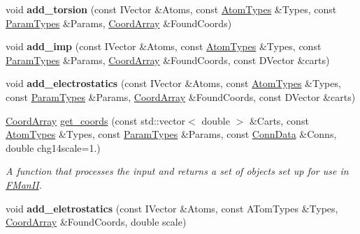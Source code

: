 \begin{DoxyCompactItemize}
\item 
void {\bfseries add\+\_\+torsion} (const I\+Vector \&Atoms, const \hyperlink{namespaceFManII_add1cccdf9425a71de6835b2631b84db8}{Atom\+Types} \&Types, const \hyperlink{namespaceFManII_a16edca665b5dfcdf9b3995844ad01bb5}{Param\+Types} \&Params, \hyperlink{namespaceFManII_a988516dba14437f483faf9f3c6d40c25}{Coord\+Array} \&Found\+Coords)\hypertarget{namespaceFManII_a881ebfcaac60e0da1409cc566861ab52}{}\label{namespaceFManII_a881ebfcaac60e0da1409cc566861ab52}

\item 
void {\bfseries add\+\_\+imp} (const I\+Vector \&Atoms, const \hyperlink{namespaceFManII_add1cccdf9425a71de6835b2631b84db8}{Atom\+Types} \&Types, const \hyperlink{namespaceFManII_a16edca665b5dfcdf9b3995844ad01bb5}{Param\+Types} \&Params, \hyperlink{namespaceFManII_a988516dba14437f483faf9f3c6d40c25}{Coord\+Array} \&Found\+Coords, const D\+Vector \&carts)\hypertarget{namespaceFManII_a3ebe80f5c7bbe67ecd94fd2512858045}{}\label{namespaceFManII_a3ebe80f5c7bbe67ecd94fd2512858045}

\item 
void {\bfseries add\+\_\+electrostatics} (const I\+Vector \&Atoms, const \hyperlink{namespaceFManII_add1cccdf9425a71de6835b2631b84db8}{Atom\+Types} \&Types, const \hyperlink{namespaceFManII_a16edca665b5dfcdf9b3995844ad01bb5}{Param\+Types} \&Params, \hyperlink{namespaceFManII_a988516dba14437f483faf9f3c6d40c25}{Coord\+Array} \&Found\+Coords, const D\+Vector \&carts)\hypertarget{namespaceFManII_a8e4be217fb18b91403f97d99b3b4c8ac}{}\label{namespaceFManII_a8e4be217fb18b91403f97d99b3b4c8ac}

\item 
\hyperlink{namespaceFManII_a988516dba14437f483faf9f3c6d40c25}{Coord\+Array} \hyperlink{namespaceFManII_a962553cf7a05889bf0f90071a59d963c}{get\+\_\+coords} (const std\+::vector$<$ double $>$ \&Carts, const \hyperlink{namespaceFManII_add1cccdf9425a71de6835b2631b84db8}{Atom\+Types} \&Types, const \hyperlink{namespaceFManII_a16edca665b5dfcdf9b3995844ad01bb5}{Param\+Types} \&Params, const \hyperlink{namespaceFManII_a7c18a61f01fcc0604c39cbfae43665df}{Conn\+Data} \&Conns, double chg14scale=1.)
\begin{DoxyCompactList}\small\item\em A function that processes the input and returns a set of objects set up for use in \hyperlink{namespaceFManII}{F\+Man\+II}. \end{DoxyCompactList}\item 
void {\bfseries add\+\_\+eletrostatics} (const I\+Vector \&Atoms, const A\+Tom\+Types \&Types, \hyperlink{namespaceFManII_a988516dba14437f483faf9f3c6d40c25}{Coord\+Array} \&Found\+Coords, double scale)\hypertarget{namespaceFManII_a7cd24ffeba90b8bfc9e235e550021d75}{}\label{namespaceFManII_a7cd24ffeba90b8bfc9e235e550021d75}


\end{DoxyCompactItemize}
